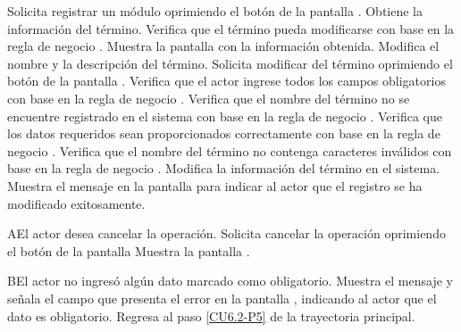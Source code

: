 	\begin{UCtrayectoria}
		\UCpaso[\UCactor] Solicita registrar un módulo oprimiendo el botón \editar de la pantalla .
		\UCpaso[\UCsist] Obtiene la información del término.
		\UCpaso[\UCsist] Verifica que el término pueda modificarse con base en la regla de negocio . 
		\UCpaso[\UCsist] Muestra la pantalla  con la información obtenida.
		\UCpaso[\UCactor] Modifica el nombre y la descripción del término. \label{CU6.2-P5}
		\UCpaso[\UCactor] Solicita modificar del término oprimiendo el botón  de la pantalla . 
		\UCpaso[\UCsist] Verifica que el actor ingrese todos los campos obligatorios con base en la regla de negocio . 
		\UCpaso[\UCsist] Verifica que el nombre del término no se encuentre registrado en el sistema con base en la regla de negocio . 
		\UCpaso[\UCsist] Verifica que los datos requeridos sean proporcionados correctamente con base en la regla de negocio .  
		\UCpaso[\UCsist] Verifica que el nombre del término no contenga caracteres inválidos con base en la regla de negocio . 
		\UCpaso[\UCsist] Modifica la información del término en el sistema.
		\UCpaso[\UCsist] Muestra el mensaje  en la pantalla  para indicar al actor que el registro se ha modificado exitosamente.
	\end{UCtrayectoria}		
	
	\begin{UCtrayectoriaA}{A}{El actor desea cancelar la operación.}
		\UCpaso[\UCactor] Solicita cancelar la operación oprimiendo el botón  de la pantalla 
		\UCpaso[\UCsist] Muestra la pantalla .
	\end{UCtrayectoriaA}

	\begin{UCtrayectoriaA}{B}{El actor no ingresó algún dato marcado como obligatorio.}
		\UCpaso[\UCsist] Muestra el mensaje  y señala el campo que presenta el error en la pantalla , indicando al actor que el dato es obligatorio.
		\UCpaso Regresa al paso \ref{CU6.2-P5} de la trayectoria principal.
	\end{UCtrayectoriaA}
	
